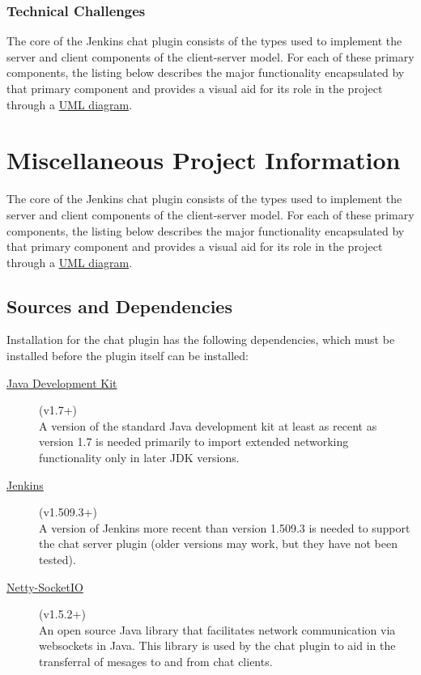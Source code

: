 \documentclass{article}
\begin{document}
			\subsubsection[Challenges]{Technical Challenges}
			The core of the Jenkins chat plugin consists of the types used to
			implement the server and client components of the client-server model.
			For each of these primary components, the listing below describes the
			major functionality encapsulated by that primary component and provides
			a visual aid for its role in the project through a 
			\href{http://www.csci.csusb.edu/dick/samples/uml0.html}{UML diagram}.


	\section[Appendix]{Miscellaneous Project Information}
	The core of the Jenkins chat plugin consists of the types used to
	implement the server and client components of the client-server model.
	For each of these primary components, the listing below describes the
	major functionality encapsulated by that primary component and provides
	a visual aid for its role in the project through a 
	\href{http://www.csci.csusb.edu/dick/samples/uml0.html}{UML diagram}.

		\subsection[Dependencies]{Sources and Dependencies}
		Installation for the chat plugin has the following dependencies, which
		must be installed before the plugin itself can be installed:

		\begin{description}
			\item[\href{http://www.oracle.com/technetwork/java/javase/downloads/jdk7-downloads-1880260.html}{Java Development Kit}] (v1.7+) \hfill \\
			A version of the standard Java development kit at least as recent 
			as version 1.7 is needed primarily to import extended networking 
			functionality only in later JDK versions.

			\item[\href{http://jenkins-ci.org/}{Jenkins}] (v1.509.3+) \hfill \\
			A version of Jenkins more recent than version 1.509.3 is needed
			to support the chat server plugin (older versions may work, but they
			have not been tested).

			\item[\href{https://github.com/mrniko/netty-socketio/releases}{Netty-SocketIO}] (v1.5.2+) \hfill \\ 
			An open source Java library that facilitates network communication 
			via websockets in Java.  This library is used by the chat plugin
			to aid in the transferral of mesages to and from chat clients.
		\end{description}
\end{document}
